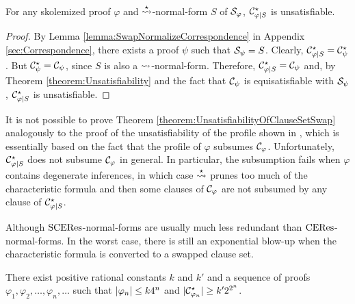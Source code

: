 \begin{theorem}
\label{theorem:UnsatisfiabilityOfClauseSetSwap}\\
For any skolemized proof $\varphi$ and $\stackrel{\star}{\leadsto}$-normal-form $S$ of $\mathcal{S}_{\varphi}$, $\mathcal{C}^{\star}_{\varphi|S}$ is unsatisfiable.
\end{theorem}
\begin{proof}
By Lemma \ref{lemma:SwapNormalizeCorrespondence} in Appendix \ref{sec:Correspondence},
there exists a proof $\psi$ such that $\mathcal{S}_{\psi} = S$. Clearly, 
$\mathcal{C}^{\star}_{\varphi|S} = \mathcal{C}^{\star}_{\psi}$. 
But $\mathcal{C}^{\star}_{\psi} = \mathcal{C}_{\psi}$, 
since $S$ is also a $\leadsto$-normal-form. 
Therefore, $\mathcal{C}^{\star}_{\varphi|S} = \mathcal{C}_{\psi}$ and, 
by Theorem \ref{theorem:Unsatisfiability} and the fact that 
$\mathcal{C}_{\psi}$ is equisatisfiable with $\mathcal{S}_{\psi}$, 
$\mathcal{C}^{\star}_{\varphi|S}$ is unsatisfiable.
\end{proof}


\begin{remark}
It is not possible to prove Theorem \ref{theorem:UnsatisfiabilityOfClauseSetSwap} analogously to the proof of the unsatisfiability of the profile shown in \cite{Hetzl2007CharacteristicClauseSetsandProofTransformations,Hetzl2008ProofProfiles.CharacteristicClauseSetsandProofTransformations}, which is essentially based on the fact that the profile of $\varphi$ subsumes $\mathcal{C}_{\varphi}$. Unfortunately, $\mathcal{C}^{\star}_{\varphi|S}$ does not subsume $\mathcal{C}_{\varphi}$ in general. In particular, the subsumption fails when $\varphi$ contains degenerate inferences, in which case $\stackrel{\star}{\leadsto}$ prunes too much of the characteristic formula and then some clauses of $\mathcal{C}_{\varphi}$ are not subsumed by any clause of $\mathcal{C}^{\star}_{\varphi|S}$.
\end{remark}


\noindent
Although $\mathrm{SCERes}$-normal-forms are usually much less redundant than $\mathrm{CERes}$-normal-forms. In the worst case, there is still an exponential blow-up when the characteristic formula is converted to a swapped clause set.

\begin{theorem}
\label{theorem:SizeOfSwappedClauseSets}
There exist positive rational constants $k$ and $k'$ and a sequence of proofs $\varphi_1, \varphi_2, \ldots, \varphi_n, \ldots$ such that $|\varphi_n| \leq k 4^n$ and $|\mathcal{C}^{\star}_{\varphi_n}| \geq k' 2^{2^n}$.
\end{theorem}

